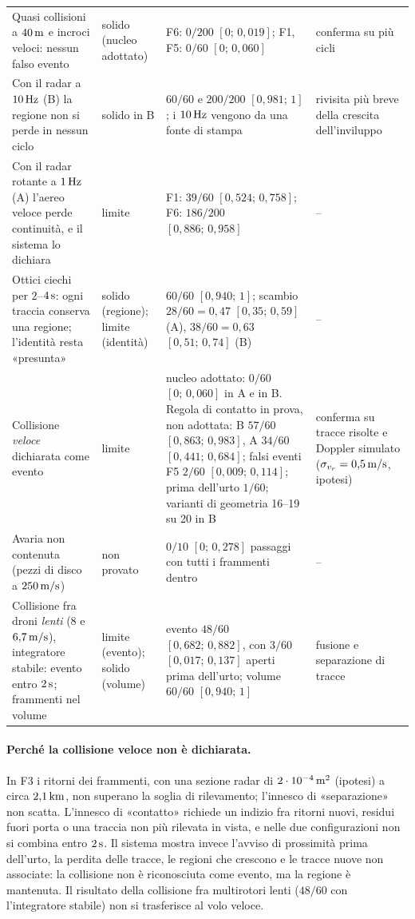 \begin{table}[H]
\begin{tabularx}{\linewidth}{@{}>{\RaggedRight\arraybackslash}p{5.0cm}>{\RaggedRight\arraybackslash}p{2.1cm}>{\RaggedRight\arraybackslash}p{4.4cm}L@{}}
Quasi collisioni a $40\,\mathrm{m}$ e incroci veloci: nessun falso evento & solido (nucleo adottato) & F6: $0/200$ $[0;\,0{,}019]$; F1, F5: $0/60$ $[0;\,0{,}060]$ & conferma su più cicli\\
Con il radar a $10\,\mathrm{Hz}$ (B) la regione non si perde in nessun ciclo & solido in B & $60/60$ e $200/200$ $[0{,}981;\,1]$; i $10\,\mathrm{Hz}$ vengono da una fonte di stampa & rivisita più breve della crescita dell'inviluppo\\
Con il radar rotante a $1\,\mathrm{Hz}$ (A) l'aereo veloce perde continuità, e il sistema lo dichiara & limite & F1: $39/60$ $[0{,}524;\,0{,}758]$; F6: $186/200$ $[0{,}886;\,0{,}958]$ & --\\
Ottici ciechi per $2$--$4\,\mathrm{s}$: ogni traccia conserva una regione; l'identità resta «presunta» & solido (regione); limite (identità) & $60/60$ $[0{,}940;\,1]$; scambio $28/60=0{,}47$ $[0{,}35;\,0{,}59]$ (A), $38/60=0{,}63$ $[0{,}51;\,0{,}74]$ (B) & --\\
Collisione \emph{veloce} dichiarata come evento & limite & nucleo adottato: $0/60$ $[0;\,0{,}060]$ in A e in B. Regola di contatto in prova, non adottata: B $57/60$ $[0{,}863;\,0{,}983]$, A $34/60$ $[0{,}441;\,0{,}684]$; falsi eventi F5 $2/60$ $[0{,}009;\,0{,}114]$; prima dell'urto $1/60$; varianti di geometria 16--19 su 20 in B & conferma su tracce risolte e Doppler simulato ($\sigma_{v_r}=0{,}5\,\mathrm{m/s}$, ipotesi)\\
Avaria non contenuta (pezzi di disco a $250\,\mathrm{m/s}$) & non provato & $0/10$ $[0;\,0{,}278]$ passaggi con tutti i frammenti dentro & --\\
Collisione fra droni \emph{lenti} ($8$ e $6{,}7\,\mathrm{m/s}$), integratore stabile: evento entro $2\,\mathrm{s}$; frammenti nel volume & limite (evento); solido (volume) & evento $48/60$ $[0{,}682;\,0{,}882]$, con $3/60$ $[0{,}017;\,0{,}137]$ aperti prima dell'urto; volume $60/60$ $[0{,}940;\,1]$ & fusione e separazione di tracce\\
\bottomrule
\end{tabularx}
\end{table}

\paragraph{Perché la collisione veloce non è dichiarata.} In F3 i ritorni dei frammenti, con una sezione radar di $2\cdot10^{-4}\,\mathrm{m^2}$ (ipotesi) a circa $2{,}1\,\mathrm{km}$, non superano la soglia di rilevamento; l'innesco di «separazione» non scatta. L'innesco di «contatto» richiede un indizio fra ritorni nuovi, residui fuori porta o una traccia non più rilevata in vista, e nelle due configurazioni non si combina entro $2\,\mathrm{s}$. Il sistema mostra invece l'avviso di prossimità prima dell'urto, la perdita delle tracce, le regioni che crescono e le tracce nuove non associate: la collisione non è riconosciuta come evento, ma la regione è mantenuta. Il risultato della collisione fra multirotori lenti ($48/60$ con l'integratore stabile) non si trasferisce al volo veloce.

